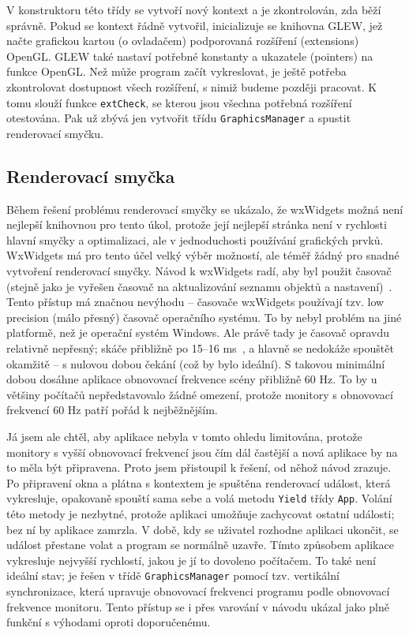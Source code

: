 \documentclass[a4paper, 11pt]{report}
\begin{document}
V konstruktoru této třídy se vytvoří nový kontext a je zkontrolován, zda běží správně. Pokud se kontext řádně vytvořil, inicializuje se knihovna GLEW, jež načte grafickou kartou (o ovladačem) podporovaná rozšíření (extensions) OpenGL. GLEW také nastaví potřebné konstanty a ukazatele (pointers) na funkce OpenGL. Než může program začít vykreslovat, je ještě potřeba zkontrolovat dostupnost všech rozšíření, s nimiž budeme později pracovat. K tomu slouží funkce \texttt{extCheck}, se kterou jsou všechna potřebná rozšíření otestována. Pak už zbývá jen vytvořit třídu \texttt{GraphicsManager} a spustit renderovací smyčku.

\subsection{Renderovací smyčka}
Během řešení problému renderovací smyčky se ukázalo, že wxWidgets možná není nejlepší knihovnou pro tento úkol, protože její nejlepší stránka není v rychlosti hlavní smyčky a optimalizaci, ale v jednoduchosti používání grafických prvků. WxWidgets má pro tento účel velký výběr možností, ale téměř žádný pro snadné vytvoření renderovací smyčky. Návod k wxWidgets radí, aby byl použit časovač (stejně jako je vyřešen časovač na aktualizování seznamu objektů a nastavení)~\cite{wx:render}. Tento přístup má značnou nevýhodu -- časovače wxWidgets používají tzv. low precision (málo přesný) časovač operačního systému. To by nebyl problém na jiné platformě, než je operační systém Windows. Ale právě tady je časovač opravdu relativně nepřesný; skáče přibližně po 15--16 ms~\cite{ms:timer}, a hlavně se nedokáže spouštět okamžitě -- s nulovou dobou čekání (což by bylo ideální). S takovou minimální dobou dosáhne aplikace obnovovací frekvence scény přibližně 60 Hz. To by u většiny počítačů nepředstavovalo žádné omezení, protože monitory s obnovovací frekvencí 60 Hz patří pořád k nejběžnějším.

Já jsem ale chtěl, aby aplikace nebyla v tomto ohledu limitována, protože monitory s vyšší obnovovací frekvencí jsou čím dál častější a nová aplikace by na to měla být připravena. Proto jsem přistoupil k řešení, od něhož návod zrazuje. Po připravení okna a plátna s kontextem je spuštěna renderovací událost, která vykresluje, opakovaně spouští sama sebe a volá metodu \texttt{Yield} třídy \texttt{App}. Volání této metody je nezbytné, protože aplikaci umožňuje zachycovat ostatní události; bez ní by aplikace zamrzla. V době, kdy se uživatel rozhodne aplikaci ukončit, se událost přestane volat a program se normálně uzavře. Tímto způsobem aplikace vykresluje nejvyšší rychlostí, jakou je jí to dovoleno počítačem. To také není ideální stav; je řešen v třídě \texttt{GraphicsManager} pomocí tzv. vertikální synchronizace, která upravuje obnovovací frekvenci programu podle obnovovací frekvence monitoru. Tento přístup se i přes varování v návodu ukázal jako plně funkční s výhodami oproti doporučenému.
\end{document}

